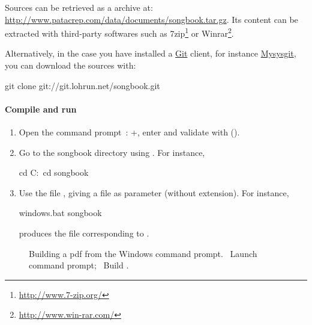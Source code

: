 Sources can be retrieved as a  archive at:
\url{http://www.patacrep.com/data/documents/songbook.tar.gz}. Its
content can be extracted with third-party softwares such as
7zip\footnote{\url{http://www.7-zip.org/}} or
Winrar\footnote{\url{http://www.win-rar.com/}}.

Alternatively, in the case you have installed a
\href{http://git-scm.com/}{Git} client, for instance
\href{http://code.google.com/p/msysgit/}{Mysysgit}, you can
download the sources with:

\begin{unix}
  git clone git://git.lohrun.net/songbook.git
\end{unix}

\paragraph{Compile and run}

\begin{enumerate}
\item Open the command prompt~: +, enter
   and validate with 
  ().
\item Go to the songbook directory using .
For instance,
  \begin{unix}
    cd C:\
    cd songbook
  \end{unix}
\item Use the file , giving a  file as parameter (without extension).
  For instance,
  \begin{unix}
    windows\make.bat songbook
  \end{unix}
  produces the file  corresponding to .

\end{enumerate}

\begin{figure}
  \centering
  \hspace{0.1cm}%
  \caption[Terminal Windows]{%
    Building a pdf from the Windows command prompt.
    ~Launch command prompt; %
    ~Build .%
  }%
  \label{fig:terminal-windows}
\end{figure}

